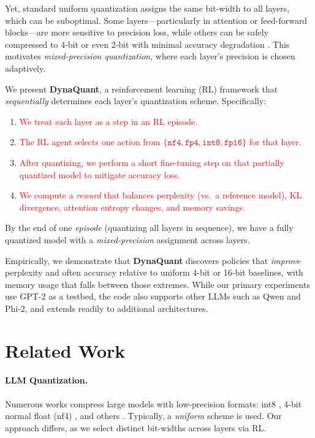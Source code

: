 \documentclass{article}
\newcommand{\red}[1]{\textcolor{red}{#1}}
\begin{document}
	Yet, standard uniform quantization assigns the same bit-width to all layers, which can be suboptimal. Some layers—particularly in attention or feed-forward blocks—are more sensitive to precision loss, while others can be safely compressed to 4-bit or even 2-bit with minimal accuracy degradation \cite{dong2019hawq,dettmers2023qlora}. This motivates \emph{mixed-precision quantization}, where each layer's precision is chosen adaptively.
	
	We present \textbf{DynaQuant}, a reinforcement learning (RL) framework that \emph{sequentially} determines each layer's quantization scheme. Specifically:
	\begin{enumerate}
		\item \red{We treat each layer as a step in an RL episode.}
		\item \red{The RL agent selects one action from $\{\texttt{nf4}, \texttt{fp4}, \texttt{int8}, \texttt{fp16}\}$ for that layer.}
		\item \red{After quantizing, we perform a short fine-tuning step on that partially quantized model to mitigate accuracy loss.}
		\item \red{We compute a \emph{reward} that balances perplexity (vs.\ a reference model), KL divergence, attention entropy changes, and memory savings.}
	\end{enumerate}
	By the end of one \emph{episode} (quantizing all layers in sequence), we have a fully quantized model with a \emph{mixed-precision} assignment across layers.
	
	Empirically, we demonstrate that \textbf{DynaQuant} discovers policies that \emph{improve} perplexity and often accuracy relative to uniform 4-bit or 16-bit baselines, with memory usage that falls between those extremes. While our primary experiments use GPT-2 as a testbed, the code also supports other LLMs such as Qwen and Phi-2, and extends readily to additional architectures.
	
	
	\section{Related Work}
	\label{sec:related}
	\paragraph{LLM Quantization.}
	Numerous works compress large models with low-precision formats: int8 \cite{dettmers2022llmint8}, 4-bit normal float (nf4) \cite{frantar2022gptq}, and others \cite{malinovskii2024pvtuning}. Typically, a \emph{uniform} scheme is used. Our approach differs, as we select distinct bit-widths across layers via RL.
	
\end{document}

